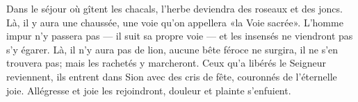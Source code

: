Dans le séjour où gîtent les chacals,
	l’herbe deviendra des roseaux et des joncs.
Là, il y aura une chaussée,
	une voie qu’on appellera «la Voie sacrée».
L’homme impur n’y passera pas --- il suit sa propre voie ---
	et les insensés ne viendront pas s’y égarer.
Là, il n’y aura pas de lion,
	aucune bête féroce ne surgira, il ne s’en trouvera pas;
	mais les rachetés y marcheront.
Ceux qu’a libérés le Seigneur reviennent,
	ils entrent dans Sion avec des cris de fête,
	couronnés de l’éternelle joie.
Allégresse et joie les rejoindront,
	douleur et plainte s’enfuient.
